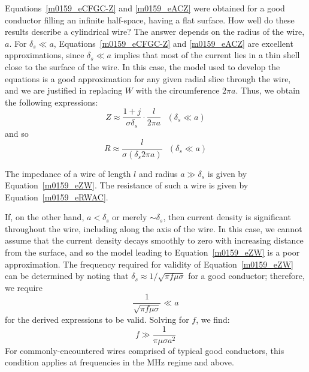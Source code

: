Equations~\ref{m0159_eCFGC-Z} and \ref{m0159_eACZ} were obtained for a good conductor filling an infinite half-space, having a flat surface. 
How well do these results describe a cylindrical wire?
The answer depends on the radius of the wire, $a$.
For $\delta_s \ll a$, Equations~\ref{m0159_eCFGC-Z} and \ref{m0159_eACZ} are excellent approximations, since $\delta_s \ll a$ implies that most of the current lies in a thin shell close to the surface of the wire.
In this case, the model used to develop the equations is a good approximation for any given radial slice through the wire, and we are justified in replacing $W$ with the circumference $2\pi a$.  Thus, we obtain the following expressions:
%
\begin{equation}
\boxed{
Z \approx \frac{1+j}{\sigma\delta_s} \cdot \frac{l}{2\pi a} ~~~ (\delta_s \ll a)
}
\label{m0159_eZW}
\end{equation}
%
and so
%
\begin{equation}
\boxed{
R \approx \frac{l}{\sigma(\delta_s 2\pi a)} ~~~ (\delta_s \ll a)
}
\label{m0159_eRWAC}
\end{equation}
%
\begin{mdframed}[backgroundcolor=yellow!20,nobreak=true] 
The impedance of a wire of length $l$ and radius $a\gg\delta_s$ is given by Equation~\ref{m0159_eZW}.
The resistance of such a wire is given by Equation~\ref{m0159_eRWAC}.
\end{mdframed}

If, on the other hand, $a < \delta_s$ or merely $\sim \delta_s$, then current density is significant throughout the wire, including along the axis of the wire.
In this case, we cannot assume that the current density decays smoothly to zero with increasing distance from the surface, and so the model leading to Equation~\ref{m0159_eZW} is a poor approximation.
The frequency required for validity of Equation~\ref{m0159_eZW} can be determined by noting that $\delta_s \approx 1/\sqrt{\pi f \mu \sigma}$ for a good conductor; therefore, we require
%
\begin{equation}
\frac{1}{\sqrt{\pi f \mu \sigma}} \ll a
\end{equation}
%
for the derived expressions to be valid.  Solving for $f$, we find:
%
\begin{equation}
f \gg \frac{1}{\pi \mu \sigma a^2} 
\label{m0159_efvalid}
\end{equation}
%
For commonly-encountered wires comprised of typical good conductors, this condition applies at frequencies in the MHz regime and above.

